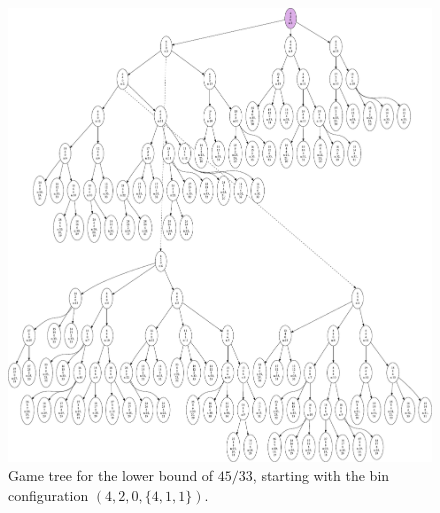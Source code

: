 \newpage
\begin{figure}[H]
  \includegraphics[scale=0.6]{img/4-2-0.pdf}
  \caption{Game tree for the lower bound of $45/33$, starting with the bin configuration $(4,2,0,\{4,1,1\})$.}
\end{figure}